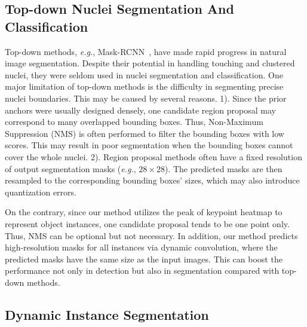 \documentclass[lettersize,journal]{IEEEtran}
\newcommand{\eg}{{\textit{e.g.}}, }
\begin{document}
\subsection{Top-down Nuclei Segmentation And Classification}
Top-down methods, \eg Mask-RCNN~\cite{maskrcnn}, have made rapid progress in natural image segmentation. Despite their potential in handling touching and clustered nuclei, they were seldom used in nuclei segmentation and classification. One major limitation of top-down  methods is the difficulty in segmenting precise nuclei boundaries. This may be caused by several reasons. 1). Since the prior anchors were usually designed  densely, one candidate region proposal may correspond to many overlapped bounding boxes. Thus, Non-Maximum Suppression (NMS) is often performed to filter the bounding boxes with low scores. This may result in poor segmentation when the bounding boxes cannot cover the whole nuclei. 2). Region proposal methods often have a fixed resolution of output segmentation masks (\eg $28 \times 28$). The predicted masks are then resampled to the corresponding bounding boxes' sizes, which may also introduce quantization errors.

On the contrary, since our method utilizes the peak of keypoint heatmap to represent object instances, one candidate proposal tends to be one point only. Thus, NMS can be optional but not necessary. In addition, our method predicts high-resolution masks for all instances via dynamic convolution, where the predicted masks have the same size as the input images. This can boost the performance not only in detection but also in segmentation compared with top-down methods.


\subsection{Dynamic Instance Segmentation}
\end{document}
